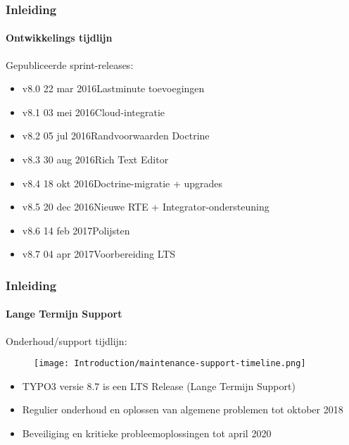 \begin{frame}[fragile]
	\frametitle{Inleiding}
	\framesubtitle{Ontwikkelings tijdlijn}

	Gepubliceerde sprint-releases:

	\begin{itemize}
		\item v8.0 \tabto{1.1cm}22 mar 2016\tabto{3.4cm}Lastminute toevoegingen
		\item v8.1 \tabto{1.1cm}03 mei 2016\tabto{3.4cm}Cloud-integratie
		\item v8.2 \tabto{1.1cm}05 jul 2016\tabto{3.4cm}Randvoorwaarden Doctrine
		\item v8.3 \tabto{1.1cm}30 aug 2016\tabto{3.4cm}Rich Text Editor
		\item v8.4 \tabto{1.1cm}18 okt 2016\tabto{3.4cm}Doctrine-migratie + upgrades
		\item v8.5 \tabto{1.1cm}20 dec 2016\tabto{3.4cm}Nieuwe RTE + Integrator-ondersteuning
		\item v8.6 \tabto{1.1cm}14 feb 2017\tabto{3.4cm}Polijsten
		\item v8.7 \tabto{1.1cm}04 apr 2017\tabto{3.4cm}Voorbereiding LTS
	\end{itemize}

\end{frame}

\begin{frame}[fragile]
	\frametitle{Inleiding}
	\framesubtitle{Lange Termijn Support}

	Onderhoud/support tijdlijn:

	\begin{figure}
		\texttt{[image: Introduction/maintenance-support-timeline.png]}
	\end{figure}

	\begin{itemize}
		\item TYPO3 versie 8.7 is een LTS Release (Lange Termijn Support)
		\item Regulier onderhoud en oplossen van algemene problemen tot oktober 2018
		\item Beveiliging en kritieke probleemoplossingen tot april 2020
	\end{itemize}

\end{frame}

